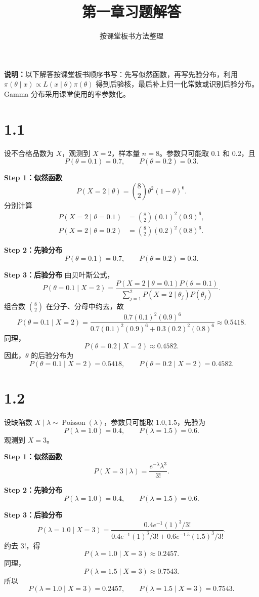 \documentclass[UTF8,zihao=-4]{ctexart}
\title{第一章习题解答}
\author{按课堂板书方法整理}
\date{}
\begin{document}
\maketitle
\noindent\textbf{说明：}以下解答按课堂板书顺序书写：先写似然函数，再写先验分布，利用
\(\pi(\theta\mid x)\propto L(x\mid\theta)\pi(\theta)\) 得到后验核，最后补上归一化常数或识别后验分布。Gamma 分布采用课堂使用的率参数化。

\section*{1.1}
设不合格品数为 \(X\)，观测到 \(X=2\)，样本量 \(n=8\)。参数只可能取 \(0.1\) 和 \(0.2\)，且
\[
P(\theta=0.1)=0.7,\qquad P(\theta=0.2)=0.3.
\]

\textbf{Step 1：似然函数}
\[
P(X=2\mid\theta)=\binom{8}{2}\theta^2(1-\theta)^6.
\]
分别计算
\[
\begin{aligned}
P(X=2\mid\theta=0.1)&=\binom{8}{2}(0.1)^2(0.9)^6,\\
P(X=2\mid\theta=0.2)&=\binom{8}{2}(0.2)^2(0.8)^6.
\end{aligned}
\]

\textbf{Step 2：先验分布}
\[
P(\theta=0.1)=0.7,\qquad P(\theta=0.2)=0.3.
\]

\textbf{Step 3：后验分布}
由贝叶斯公式，
\[
P(\theta=0.1\mid X=2)
=\frac{P(X=2\mid\theta=0.1)P(\theta=0.1)}
{\sum_{j=1}^2P(X=2\mid\theta_j)P(\theta_j)}.
\]
组合数 \(\binom{8}{2}\) 在分子、分母中约去，故
\[
P(\theta=0.1\mid X=2)
=\frac{0.7(0.1)^2(0.9)^6}
{0.7(0.1)^2(0.9)^6+0.3(0.2)^2(0.8)^6}
\approx0.5418.
\]
同理，
\[
P(\theta=0.2\mid X=2)\approx0.4582.
\]
因此，\(\theta\) 的后验分布为
\[
\boxed{P(\theta=0.1\mid X=2)=0.5418,\qquad
P(\theta=0.2\mid X=2)=0.4582.}
\]

\section*{1.2}
设缺陷数 \(X\mid\lambda\sim\operatorname{Poisson}(\lambda)\)，参数只可能取 \(1.0,1.5\)，先验为
\[
P(\lambda=1.0)=0.4,\qquad P(\lambda=1.5)=0.6.
\]
观测到 \(X=3\)。

\textbf{Step 1：似然函数}
\[
P(X=3\mid\lambda)=\frac{e^{-\lambda}\lambda^3}{3!}.
\]

\textbf{Step 2：先验分布}
\[
P(\lambda=1.0)=0.4,\qquad P(\lambda=1.5)=0.6.
\]

\textbf{Step 3：后验分布}
\[
P(\lambda=1.0\mid X=3)
=\frac{0.4e^{-1}(1)^3/3!}
{0.4e^{-1}(1)^3/3!+0.6e^{-1.5}(1.5)^3/3!}.
\]
约去 \(3!\)，得
\[
P(\lambda=1.0\mid X=3)\approx0.2457.
\]
同理，
\[
P(\lambda=1.5\mid X=3)\approx0.7543.
\]
所以
\[
\boxed{P(\lambda=1.0\mid X=3)=0.2457,\qquad
P(\lambda=1.5\mid X=3)=0.7543.}
\]
\end{document}

